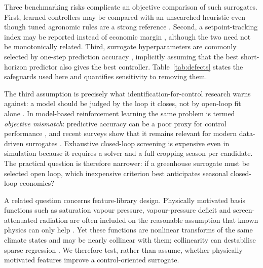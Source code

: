 Three benchmarking risks complicate an objective comparison of such surrogates. First,
learned controllers may be compared with an unsearched heuristic even though tuned
agronomic rules are a strong reference \cite{morcego2023,mallick2025,vanlaatum2025}.
Second, a setpoint-tracking index may be reported instead of economic margin
\cite{lin2021,morcego2023}, although the two need not be monotonically related. Third,
surrogate hyperparameters are commonly selected by one-step prediction accuracy
\cite{kaiser2018,yonezawa2026}, implicitly assuming that the best short-horizon predictor
also gives the best controller. Table~\ref{tab:defects} states the safeguards used here
and quantifies sensitivity to removing them.

The third assumption is precisely what identification-for-control research warns against:
a model should be judged by the loop it closes, not by open-loop fit alone
\cite{ljung1999,gevers1993,vandenhof1995}. In model-based reinforcement learning the same
problem is termed \emph{objective mismatch}: predictive accuracy can be a poor proxy for
control performance \cite{lambert2020,jackson2022,farahmand2017}, and recent surveys show
that it remains relevant for modern data-driven surrogates
\cite{wei2024,controlorientedsurvey2025}. Exhaustive closed-loop screening is expensive
even in simulation because it requires a solver and a full cropping season per candidate.
The practical question is therefore narrower: if a greenhouse surrogate must be selected
open loop, which inexpensive criterion best anticipates seasonal closed-loop economics?

A related question concerns feature-library design. Physically motivated basis functions
such as saturation vapour pressure, vapour-pressure deficit and screen-attenuated
radiation are often included on the reasonable assumption that known physics can only
help \cite{raissi2019,karniadakis2021}. Yet these functions are nonlinear transforms of
the same climate states and may be nearly collinear with them; collinearity can destabilise
sparse regression \cite{cortiella2021,balanceguided2026}. We therefore test, rather than
assume, whether physically motivated features improve a control-oriented surrogate.

